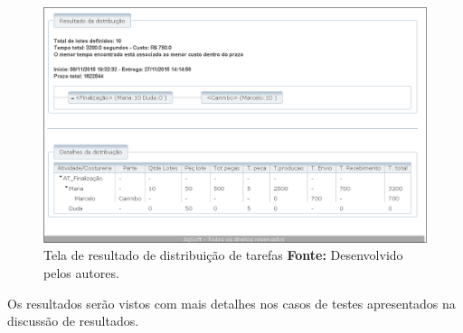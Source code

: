 \newpage

\begin{figure}[h!]
	\centerline{\includegraphics[scale=0.5]{./imagens/resultado_distribuicao.png}}
	\caption[Tela de resultado de distribuição de tarefas]
	{Tela de resultado de distribuição de tarefas
		\textbf{Fonte:} Desenvolvido pelos autores.}
	\label{fig:tela_dis_result}
\end{figure}

\par Os resultados serão vistos com mais detalhes nos casos de testes apresentados na discussão de resultados.

